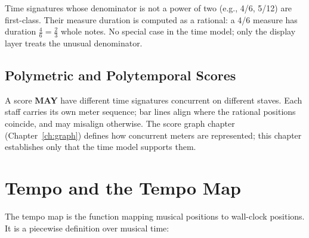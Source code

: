\documentclass[11pt,letterpaper]{report}
\newcommand{\MAY}{\textbf{MAY}}
\begin{document}
Time signatures whose denominator is not a power of two
(e.g., 4/6, 5/12) are first-class. Their measure duration is computed
as a rational: a 4/6 measure has duration $\frac{4}{6} = \frac{2}{3}$
whole notes. No special case in the time model; only the display layer
treats the unusual denominator.

\subsection{Polymetric and Polytemporal Scores}

A score \MAY{} have different time signatures concurrent on different
staves. Each staff carries its own meter sequence; bar lines align where
the rational positions coincide, and may misalign otherwise. The score
graph chapter (Chapter~\ref{ch:graph}) defines how concurrent meters
are represented; this chapter establishes only that the time model
supports them.

\section{Tempo and the Tempo Map}
\label{sec:time:tempomap}

The tempo map is the function mapping musical positions to wall-clock
positions. It is a piecewise definition over musical time:
\end{document}
